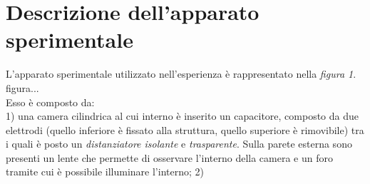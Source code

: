 \section{Descrizione dell'apparato sperimentale}
    L'apparato sperimentale utilizzato nell'esperienza è rappresentato nella \textit{figura 1}.\\

    figura...\\

    Esso è composto da:\\
    1) una camera cilindrica al cui interno è inserito un capacitore, composto da due elettrodi (quello inferiore è fissato alla struttura, quello superiore è rimovibile) tra i quali è posto un \textit{distanziatore isolante} e \textit{trasparente}. Sulla parete esterna sono presenti un lente che permette di osservare l'interno della camera e un foro tramite cui è possibile illuminare l'interno;
    2)